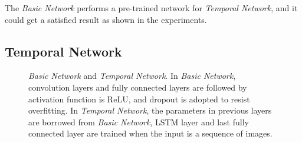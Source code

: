 \documentclass[journal,comsoc]{IEEEtran}
\let\MYoriglatexcaption\caption
\renewcommand{\caption}[2][\relax]{\MYoriglatexcaption[#2]{#2}}
\begin{document}
The \emph{Basic Network} performs a pre-trained network for \emph{Temporal Network}, and it could get a
satisfied result as shown in the experiments.

\subsection{Temporal Network}\label{sec:temporal netowork}
\begin{figure}[t]
    \centering
\caption{\emph{Basic Network} and \emph{Temporal Network}. In \emph{Basic Network}, convolution
layers and fully connected layers are followed by activation function is ReLU, and dropout is
adopted to resist overfitting. In \emph{Temporal Network}, the parameters in previous layers are
borrowed from \emph{Basic Network}, LSTM layer and last fully connected layer are trained when
the input is a sequence of images.}
\label{fig:basic and lstm network}
\end{figure}
\end{document}
